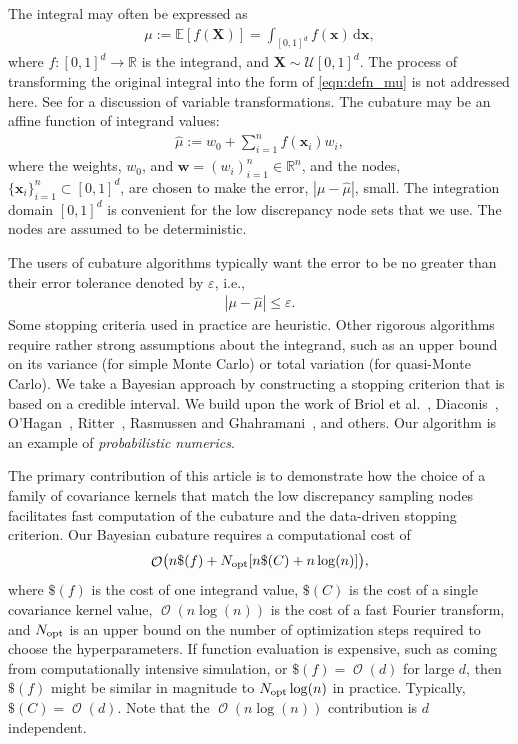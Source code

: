 \documentclass[twocolumn]{svjour3}          %
\DeclareMathOperator{\Order}{{\mathcal O}}
\newcommand{\bm}[1]{\boldsymbol{#1}}
\newcommand{\dif}[1]{\text{d}{#1}}
\newcommand{\reals}{\mathbb{R}}
\newcommand{\Ex}{\mathbb{E}}
\newcommand{\vw}{\bm{w}}
\newcommand{\vx}{\bm{x}}
\newcommand{\hmu}{\widehat{\mu}}
\newcommand{\errtol}{\varepsilon}
\def\abs#1{\ensuremath{\left \lvert #1 \right \rvert}}
\begin{document}
The integral may often be expressed as
\begin{align}
\label{eqn:defn_mu}
\mu:= \Ex[f(\boldsymbol{X})] = \int_{[0,1]^d} f(\vx)\, \dif\vx, 
\end{align}
where $f:[0,1]^d \to \reals$ is the integrand, and $\boldsymbol{X} \sim \mathcal{U}[0,1]^d$.  The process of transforming the original integral into the form of \eqref{eqn:defn_mu} is not addressed here. See \cite[Section 2.11]{DicEtal14a} 
for a discussion of variable transformations. The cubature may be an affine function of integrand values:
\begin{align}
\label{eqn:defn_hmu}  %
\hmu := w_0 + \sum_{i=1}^{n} f(\vx_i) w_i,
\end{align}
where the weights, $w_0$, and  $\vw = (w_i)_{i=1}^n \in \reals^n$, and the nodes, $\{\vx_i\}_{i=1}^n \subset [0,1]^d$, are chosen to make the error, $\abs{\mu - \hmu}$, small. The integration domain $[0,1]^d$ is convenient for the low discrepancy node sets \cite{DicEtal14a,SloJoe94} that we use.  The nodes are assumed to be deterministic.

The users of cubature algorithms typically want the error to be no greater than their error tolerance denoted by $\varepsilon$, i.e., 
\begin{align}
\label{eqn:err_crit} 
\abs{\mu - \hmu} \leq \errtol .
\end{align}
Some stopping criteria used in practice are heuristic.  Other rigorous algorithms require rather strong assumptions about the integrand, such as an upper bound on its variance (for simple Monte Carlo) or total variation (for quasi-Monte Carlo).  We take a Bayesian approach by constructing a stopping criterion that is based on a credible interval.  We build upon the work of Briol et al.~\cite{BriEtal18a}, Diaconis~\cite{Dia88a}, O'Hagan~\cite{OHa91a}, Ritter~\cite{Rit00a}, Rasmussen and Ghahramani~\cite{RasGha03a}, and others.  Our algorithm is an example of \emph{probabilistic numerics}.

The primary contribution of this article is to demonstrate how the choice of a family of covariance kernels that match the low discrepancy sampling nodes facilitates fast computation of the cubature and the data-driven stopping criterion.  Our Bayesian cubature requires a computational cost of
\begin{equation} \label{eqn:OuralgoCost}
    \Order\bigl(n \$(f) + N_{\textup{opt}}[n\$(C) + n \log(n)] \bigr),
\end{equation} 
where $\$(f)$ is the cost of one integrand value, $\$(C)$ is the cost of a single covariance kernel value,  $\Order(n \log(n))$ is the cost of a fast Fourier transform, and $N_{\textup{opt}}$ is an upper bound on the number of optimization steps required to choose the hyperparameters. If function evaluation is expensive, such as coming from computationally intensive simulation, or $\$(f) = \Order(d)$ for large $d$, then $\$(f)$ might be similar in magnitude to $N_{\textup{opt}} \log(n)$ in practice.  Typically, $\$(C) = \Order(d)$.  Note that the $\Order(n \log(n))$ contribution is $d$ independent.
\end{document}

